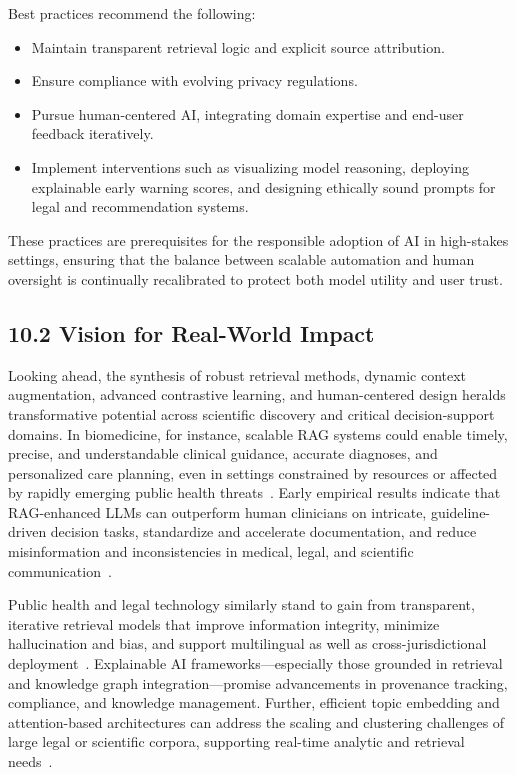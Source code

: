 \documentclass[11pt]{article}
\begin{document}
Best practices recommend the following:
\begin{itemize}
    \item Maintain transparent retrieval logic and explicit source attribution.
    \item Ensure compliance with evolving privacy regulations.
    \item Pursue human-centered AI, integrating domain expertise and end-user feedback iteratively.
    \item Implement interventions such as visualizing model reasoning, deploying explainable early warning scores, and designing ethically sound prompts for legal and recommendation systems.
\end{itemize}
These practices are prerequisites for the responsible adoption of AI in high-stakes settings, ensuring that the balance between scalable automation and human oversight is continually recalibrated to protect both model utility and user trust.

\subsection{10.2 Vision for Real-World Impact}

Looking ahead, the synthesis of robust retrieval methods, dynamic context augmentation, advanced contrastive learning, and human-centered design heralds transformative potential across scientific discovery and critical decision-support domains. In biomedicine, for instance, scalable RAG systems could enable timely, precise, and understandable clinical guidance, accurate diagnoses, and personalized care planning, even in settings constrained by resources or affected by rapidly emerging public health threats~\cite{ref1,ref2,ref5,ref9,ref11}. Early empirical results indicate that RAG-enhanced LLMs can outperform human clinicians on intricate, guideline-driven decision tasks, standardize and accelerate documentation, and reduce misinformation and inconsistencies in medical, legal, and scientific communication~\cite{ref6,ref8,ref22,ref36,ref40}.

Public health and legal technology similarly stand to gain from transparent, iterative retrieval models that improve information integrity, minimize hallucination and bias, and support multilingual as well as cross-jurisdictional deployment~\cite{ref10,ref20,ref36,ref38}. Explainable AI frameworks—especially those grounded in retrieval and knowledge graph integration—promise advancements in provenance tracking, compliance, and knowledge management. Further, efficient topic embedding and attention-based architectures can address the scaling and clustering challenges of large legal or scientific corpora, supporting real-time analytic and retrieval needs~\cite{ref13,ref19,ref21}.
\end{document}
